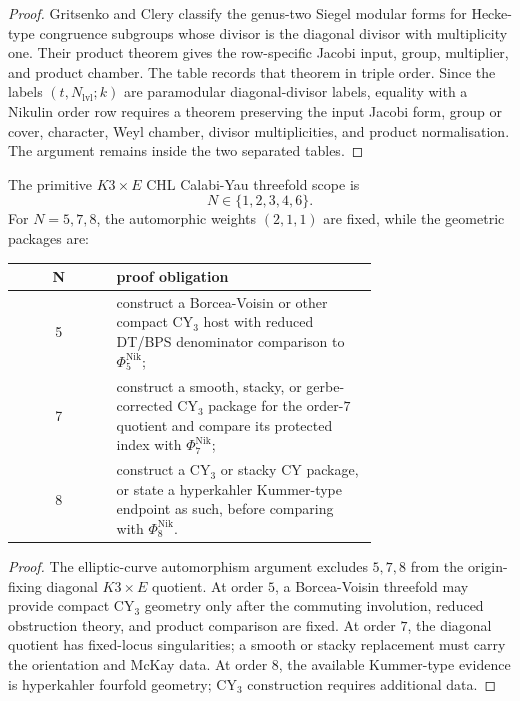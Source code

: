 \begin{proof}
Gritsenko and Clery classify the genus-two Siegel modular forms for
Hecke-type congruence subgroups whose divisor is the diagonal divisor
with multiplicity one.  Their product theorem gives the row-specific
Jacobi input, group, multiplier, and product chamber.  The table records
that theorem in triple order.  Since the labels
\((t,N_{\mathrm{lvl}};k)\) are paramodular diagonal-divisor labels,
equality with a Nikulin order row requires a theorem preserving the
input Jacobi form, group or cover, character, Weyl chamber, divisor
multiplicities, and product normalisation.  The argument remains inside
the two separated tables.
\end{proof}

\begin{corollary}
\label{cor:n578-geometric-scope}
The primitive \(K3\times E\) CHL Calabi-Yau threefold scope is
\[
   N\in\{1,2,3,4,6\}.
\]
For \(N=5,7,8\), the automorphic weights \((2,1,1)\) are fixed, while
the geometric packages are:
\begin{center}
\begin{tabular}{c|p{0.72\linewidth}}
N & proof obligation\\ \hline
5 & construct a Borcea-Voisin or other compact CY$_3$ host with
reduced DT/BPS denominator comparison to \(\Phi_5^{\mathrm{Nik}}\);\\
7 & construct a smooth, stacky, or gerbe-corrected CY$_3$ package for
the order-\(7\) quotient and compare its protected index with
\(\Phi_7^{\mathrm{Nik}}\);\\
8 & construct a CY$_3$ or stacky CY package, or state a hyperkahler
Kummer-type endpoint as such, before comparing with \(\Phi_8^{\mathrm{Nik}}\).
\end{tabular}
\end{center}
\end{corollary}

\begin{proof}
The elliptic-curve automorphism argument excludes \(5,7,8\) from the
origin-fixing diagonal \(K3\times E\) quotient.  At order \(5\), a
Borcea-Voisin threefold may provide compact CY$_3$ geometry only after
the commuting involution, reduced obstruction theory, and product
comparison are fixed.  At order \(7\), the diagonal quotient has
fixed-locus singularities; a smooth or stacky replacement must carry the
orientation and McKay data.  At order \(8\), the available Kummer-type
evidence is hyperkahler fourfold geometry; CY$_3$ construction requires
additional data.
\end{proof}

